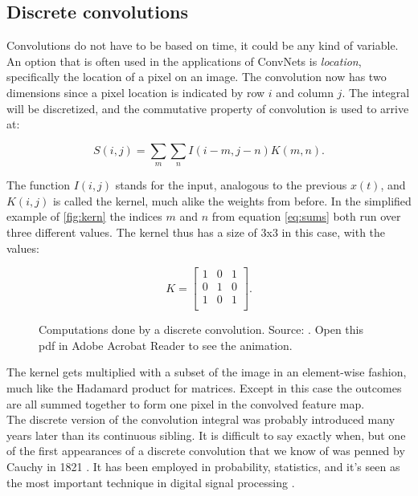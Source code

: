 \subsection{Discrete convolutions}

Convolutions do not have to be based on time, it could be any kind of variable. An option that is often used in the applications of ConvNets is \textit{location}, specifically the location of a pixel on an image. The convolution now has two dimensions since a pixel location is indicated by row $i$ and column $j$. The integral will be discretized, and the commutative property of convolution is used to arrive at:

\begin{equation}\label{eq:sums}
    S(i,j) = \sum_m \sum_n I(i-m,j-n)K(m,n).
\end{equation}

The function $I(i,j)$ stands for the input, analogous to the previous $x(t)$, and $K(i,j)$ is called the kernel, much alike the weights from before. In the simplified example of \autoref{fig:kern} the indices $m$ and $n$ from equation \eqref{eq:sums} both run over three different values. The kernel thus has a size of 3x3 in this case, with the values:

\begin{equation*}
    K = 
    \begin{bmatrix}
        1 & 0 & 1 \\
        0 & 1 & 0 \\
        1 & 0 & 1 \\
    \end{bmatrix}.
\end{equation*}

\begin{figure}
    \centering
    \caption{Computations done by a discrete convolution. Source: \cite{stanf}. Open this pdf in Adobe Acrobat Reader to see the animation.}
    \label{fig:kern}
\end{figure}

The kernel gets multiplied with a subset of the image in an element-wise fashion, much like the Hadamard product for matrices. Except in this case the outcomes are all summed together to form one pixel in the convolved feature map.\\

The discrete version of the convolution integral was probably introduced many years later than its continuous sibling. It is difficult to say exactly when, but one of the first appearances of a discrete convolution that we know of was penned by Cauchy in 1821 \cite{tor}. It has been employed in probability, statistics, and it's seen as the most important technique in digital signal processing \cite[Ch. 6]{dsp}.\\

